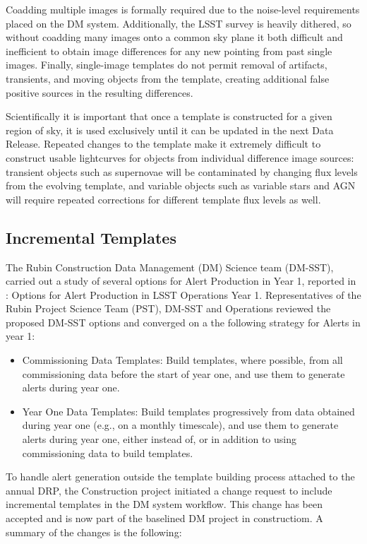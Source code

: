Coadding multiple images is formally required due to the noise-level requirements placed on the DM system.
Additionally, the LSST survey is heavily dithered, so without coadding many images onto a common sky plane it both difficult and inefficient to obtain image differences for any new pointing from past single images.
Finally, single-image templates do not permit removal of artifacts, transients, and moving objects from the template, creating additional false positive sources in the resulting differences.

Scientifically it is important that once a template is constructed for a given region of sky, it is used exclusively until it can be updated in the next Data Release.
Repeated changes to the template make it extremely difficult to construct usable lightcurves for objects from individual difference image sources: transient objects such as supernovae will be contaminated by changing flux levels from the evolving template, and variable objects such as variable stars and AGN will require repeated corrections for different template flux levels as well.

\subsection{Incremental Templates}

The Rubin Construction Data Management (DM) Science team (DM-SST), carried out a study of several options for Alert Production in Year 1, reported in  : Options for Alert Production in LSST Operations Year 1.  
Representatives of the Rubin Project Science Team (PST), DM-SST and Operations reviewed the proposed DM-SST options  and converged on a the following  strategy for Alerts in year 1:

\begin{itemize}
\item Commissioning Data Templates: Build templates, where possible, from all commissioning data before the start of year one, and use them to generate alerts during year one. 
\item Year One Data Templates: Build templates progressively from data obtained during year one (e.g., on a monthly timescale), and use them to generate alerts during year one, either instead of, or in addition to using commissioning data to build templates.
\end{itemize}

To handle alert generation outside the template building process attached to the annual DRP, the Construction project initiated a change request to include incremental templates in the DM system workflow. This change has been accepted and is now part of the baselined DM project in constructiom. A summary of the changes is the following:

